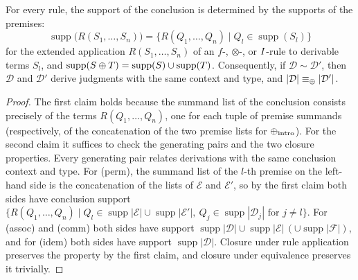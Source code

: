 \begin{lemma}
\label{lemma:perm_supp}
For every rule, the support of the conclusion is determined by the supports of the premises:
\[
\operatorname{supp}\bigl(R(S_1, \ldots, S_n)\bigr) = \{ R(Q_1, \ldots, Q_n) \mid Q_l \in \operatorname{supp}(S_l) \}
\]
for the extended application $R(S_1,\ldots,S_n)$ of an $f$-, $\otimes$-, or $I$-rule to derivable terms $S_l$, and
$\operatorname{supp}(S \mathbin{\oplus} T) = \operatorname{supp}(S) \cup \operatorname{supp}(T)$.
Consequently, if $\mathcal{D} \sim \mathcal{D}'$, then $\mathcal{D}$ and $\mathcal{D}'$ derive judgments with the same context and type, and $|\mathcal{D}| \equiv_{\mathbin{\oplus}} |\mathcal{D}'|$.
\end{lemma}
\begin{proof}
The first claim holds because the summand list of the conclusion consists precisely of the terms $R(Q_1, \ldots, Q_n)$, one for each tuple of premise summands (respectively, of the concatenation of the two premise lists for $\mathbin{\oplus}_{\text{intro}}$).
For the second claim it suffices to check the generating pairs and the two closure properties.
Every generating pair relates derivations with the same conclusion context and type.
For (perm), the summand list of the $l$-th premise on the left-hand side is the concatenation of the lists of $\mathcal{E}$ and $\mathcal{E}'$, so by the first claim both sides have conclusion support
$\{ R(Q_1, \ldots, Q_n) \mid Q_l \in \operatorname{supp}|\mathcal{E}| \cup \operatorname{supp}|\mathcal{E}'|,\ Q_j \in \operatorname{supp}|\mathcal{D}_j| \text{ for } j \neq l \}$.
For (assoc) and (comm) both sides have support $\operatorname{supp}|\mathcal{D}| \cup \operatorname{supp}|\mathcal{E}| \,(\cup \operatorname{supp}|\mathcal{F}|)$, and for (idem) both sides have support $\operatorname{supp}|\mathcal{D}|$.
Closure under rule application preserves the property by the first claim, and closure under equivalence preserves it trivially.
\end{proof}

